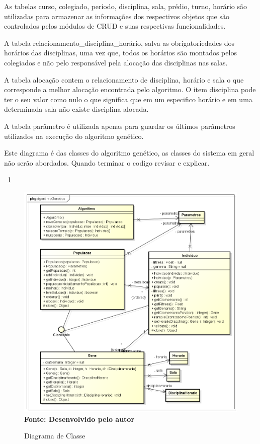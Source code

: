 As tabelas curso, colegiado, período, disciplina, sala, prédio, turno, horário são utilizadas para armazenar as informações dos respectivos objetos que são controlados pelos módulos de CRUD e suas respectivas funcionalidades.\par

A tabela relacionamento\_disciplina\_horário, salva as obrigatoriedades dos horários das disciplinas, uma vez que, todos os horários são montados pelos colegiados e não pelo responsável pela alocação das disciplinas nas salas.\par

A tabela alocação contem o relacionamento de disciplina, horário e sala o que corresponde a melhor alocação encontrada pelo algoritmo. O item disciplina pode ter o seu valor como nulo o que significa que em um especifico horário e em uma determinada sala não existe disciplina alocada.\par

A tabela parâmetro é utilizada apenas para guardar os últimos parâmetros utilizados na execução do algoritmo genético.\par



Este diagrama é das classes do algoritmo genético, as classes do sistema em geral não serão abordados. Quando terminar o codigo revisar e explicar.\par
~\ref{fig:dc}
\begin{figure}[!htb]
\caption[Diagrama de Classe]{Diagrama de Classe}
\label{fig:dc}
\centering
\includegraphics[scale=0.5]{imagens/diagramaClasse.png}
\\ \textbf{\footnotesize Fonte: Desenvolvido pelo autor}
\end{figure}

